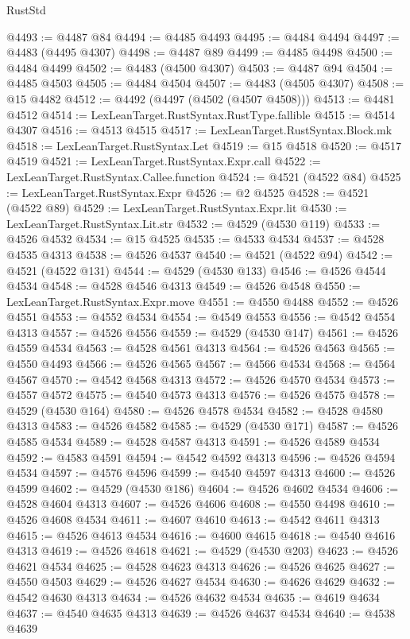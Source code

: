 \begin{lexlean}{RustStd}
\begin{coremodule}
@4493 := @4487 @84
@4494 := @4485 @4493
@4495 := @4484 @4494
@4497 := @4483 (@4495 @4307)
@4498 := @4487 @89
@4499 := @4485 @4498
@4500 := @4484 @4499
@4502 := @4483 (@4500 @4307)
@4503 := @4487 @94
@4504 := @4485 @4503
@4505 := @4484 @4504
@4507 := @4483 (@4505 @4307)
@4508 := @15 @4482
@4512 := @4492 (@4497 (@4502 (@4507 @4508)))
@4513 := @4481 @4512
@4514 := LexLeanTarget.RustSyntax.RustType.fallible
@4515 := @4514 @4307
@4516 := @4513 @4515
@4517 := LexLeanTarget.RustSyntax.Block.mk
@4518 := LexLeanTarget.RustSyntax.Let
@4519 := @15 @4518
@4520 := @4517 @4519
@4521 := LexLeanTarget.RustSyntax.Expr.call
@4522 := LexLeanTarget.RustSyntax.Callee.function
@4524 := @4521 (@4522 @84)
@4525 := LexLeanTarget.RustSyntax.Expr
@4526 := @2 @4525
@4528 := @4521 (@4522 @89)
@4529 := LexLeanTarget.RustSyntax.Expr.lit
@4530 := LexLeanTarget.RustSyntax.Lit.str
@4532 := @4529 (@4530 @119)
@4533 := @4526 @4532
@4534 := @15 @4525
@4535 := @4533 @4534
@4537 := @4528 @4535 @4313
@4538 := @4526 @4537
@4540 := @4521 (@4522 @94)
@4542 := @4521 (@4522 @131)
@4544 := @4529 (@4530 @133)
@4546 := @4526 @4544 @4534
@4548 := @4528 @4546 @4313
@4549 := @4526 @4548
@4550 := LexLeanTarget.RustSyntax.Expr.move
@4551 := @4550 @4488
@4552 := @4526 @4551
@4553 := @4552 @4534
@4554 := @4549 @4553
@4556 := @4542 @4554 @4313
@4557 := @4526 @4556
@4559 := @4529 (@4530 @147)
@4561 := @4526 @4559 @4534
@4563 := @4528 @4561 @4313
@4564 := @4526 @4563
@4565 := @4550 @4493
@4566 := @4526 @4565
@4567 := @4566 @4534
@4568 := @4564 @4567
@4570 := @4542 @4568 @4313
@4572 := @4526 @4570 @4534
@4573 := @4557 @4572
@4575 := @4540 @4573 @4313
@4576 := @4526 @4575
@4578 := @4529 (@4530 @164)
@4580 := @4526 @4578 @4534
@4582 := @4528 @4580 @4313
@4583 := @4526 @4582
@4585 := @4529 (@4530 @171)
@4587 := @4526 @4585 @4534
@4589 := @4528 @4587 @4313
@4591 := @4526 @4589 @4534
@4592 := @4583 @4591
@4594 := @4542 @4592 @4313
@4596 := @4526 @4594 @4534
@4597 := @4576 @4596
@4599 := @4540 @4597 @4313
@4600 := @4526 @4599
@4602 := @4529 (@4530 @186)
@4604 := @4526 @4602 @4534
@4606 := @4528 @4604 @4313
@4607 := @4526 @4606
@4608 := @4550 @4498
@4610 := @4526 @4608 @4534
@4611 := @4607 @4610
@4613 := @4542 @4611 @4313
@4615 := @4526 @4613 @4534
@4616 := @4600 @4615
@4618 := @4540 @4616 @4313
@4619 := @4526 @4618
@4621 := @4529 (@4530 @203)
@4623 := @4526 @4621 @4534
@4625 := @4528 @4623 @4313
@4626 := @4526 @4625
@4627 := @4550 @4503
@4629 := @4526 @4627 @4534
@4630 := @4626 @4629
@4632 := @4542 @4630 @4313
@4634 := @4526 @4632 @4534
@4635 := @4619 @4634
@4637 := @4540 @4635 @4313
@4639 := @4526 @4637 @4534
@4640 := @4538 @4639

\end{coremodule}
\end{lexlean}
